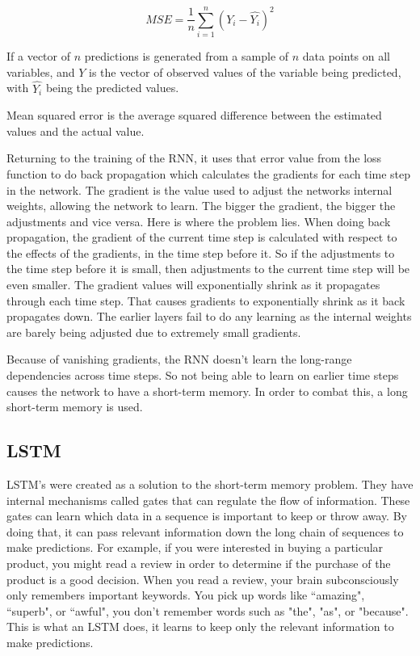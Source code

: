 \begin{equation}
    MSE = \frac{1}{n}\sum_{i=1}^n(Y_i-\hat{Y_i})^2
\end{equation}

If  a vector of $n$ predictions is generated from a sample of $n$ data points on all variables, and $Y$ is the vector of observed values of the variable being predicted, with $\hat{Y_i}$ being the predicted values.

\begin{definition}
Mean squared error is the average squared difference between the estimated values and the actual value.
\end{definition}

Returning to the training of the RNN, it uses that error value from the loss function to do back propagation which calculates the gradients for each time step in the network. The gradient is the value used to adjust the networks internal weights, allowing the network to learn. The bigger the gradient, the bigger the adjustments and vice versa. Here is where the problem lies. When doing back propagation, the gradient of the current time step is calculated with respect to the effects of the gradients, in the time step before it. So if the adjustments to the time step before it is small, then adjustments to the current time step will be even smaller.  The gradient values will exponentially shrink as it propagates through each time step. That causes gradients to exponentially shrink as it back propagates down. The earlier layers fail to do any learning as the internal weights are barely being adjusted due to extremely small gradients.

Because of vanishing gradients, the RNN doesn’t learn the long-range dependencies across time steps. So not being able to learn on earlier time steps causes the network to have a short-term memory. In order to combat this, a long short-term memory is used\cite{intro_rnn}.

\subsection{LSTM}
LSTM's were created as a solution to the short-term memory problem. They have internal mechanisms called gates that can regulate the flow of information. These gates can learn which data in a sequence is important to keep or throw away. By doing that, it can pass relevant information down the long chain of sequences to make predictions. For example, if you were interested in buying a particular product, you might read a review in order to determine if the purchase of the product is a good decision. When you read a review, your brain subconsciously only remembers important keywords. You pick up words like ``amazing", ``superb", or ``awful", you don't remember words such as "the", "as", or "because". This is what an LSTM does, it learns to keep only the relevant information to make predictions.

